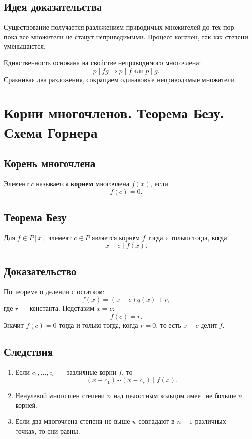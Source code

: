 \documentclass[12pt,a4paper]{article}
\begin{document}
\subsection*{Идея доказательства}

Существование получается разложением приводимых множителей до тех пор, пока все множители не станут неприводимыми. Процесс конечен, так как степени уменьшаются.

Единственность основана на свойстве неприводимого многочлена:
\[
    p\mid fg\Rightarrow p\mid f\ \text{или}\ p\mid g.
\]
Сравнивая два разложения, сокращаем одинаковые неприводимые множители.

\section{Корни многочленов. Теорема Безу. Схема Горнера}

\subsection*{Корень многочлена}

Элемент $c$ называется \textbf{корнем} многочлена $f(x)$, если
\[
    f(c)=0.
\]

\subsection*{Теорема Безу}

Для $f\in P[x]$ элемент $c\in P$ является корнем $f$ тогда и только тогда, когда
\[
    x-c\mid f(x).
\]

\subsection*{Доказательство}

По теореме о делении с остатком:
\[
    f(x)=(x-c)q(x)+r,
\]
где $r$ --- константа. Подставим $x=c$:
\[
    f(c)=r.
\]
Значит $f(c)=0$ тогда и только тогда, когда $r=0$, то есть $x-c$ делит $f$.

\subsection*{Следствия}

\begin{enumerate}
    \item Если $c_1,\ldots,c_s$ --- различные корни $f$, то
    \[
        (x-c_1)\cdots(x-c_s)\mid f(x).
    \]
    \item Ненулевой многочлен степени $n$ над целостным кольцом имеет не больше $n$ корней.
    \item Если два многочлена степени не выше $n$ совпадают в $n+1$ различных точках, то они равны.
\end{enumerate}
\end{document}

